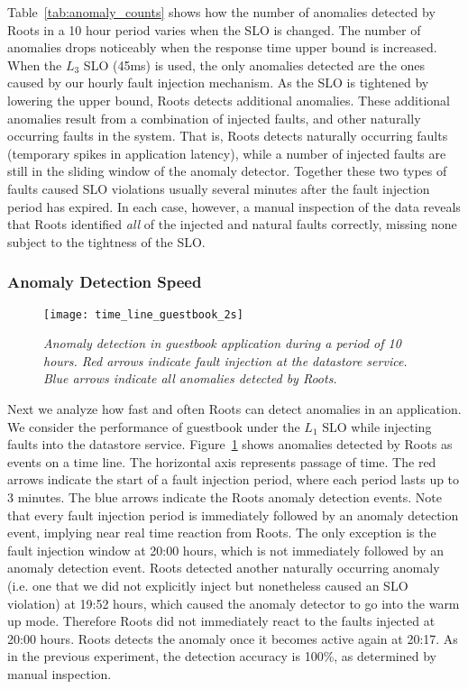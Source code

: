 Table~\ref{tab:anomaly_counts} shows how the number of anomalies detected by 
Roots in a 10 hour period varies when the SLO is changed. The number of anomalies
drops noticeably when the response time upper bound is increased. When the $L_3$
SLO (45ms) is used, the only anomalies detected are the ones
caused by our hourly fault injection mechanism. As the SLO is tightened by lowering the upper bound,
Roots detects additional anomalies. These additional anomalies
result from a combination of injected faults, and other naturally occurring faults
in the system. That is, Roots detects naturally occurring
faults (temporary spikes in application latency), while a number of injected faults
are still in the sliding window of the anomaly detector. Together these two types of
faults caused SLO violations usually several minutes after the fault injection period
has expired.  In each case, however, a manual inspection of the data reveals
that Roots identified \textit{all} of the injected and natural faults correctly,
missing none subject to the tightness of the SLO.

\subsubsection{Anomaly Detection Speed}

\begin{figure}
\centering
\texttt{[image: time\_line\_guestbook\_2s]}
\caption{\textit{Anomaly detection in guestbook application during a period of 10 hours. 
Red arrows indicate fault injection
at the datastore service. Blue arrows indicate all anomalies detected by
Roots.
}}
\label{fig:time_line_guestbook_2s}
\end{figure}

Next we analyze how fast and often Roots can detect anomalies in an application. We
consider the performance of guestbook under the $L_1$ SLO while 
injecting faults into the datastore service. Figure~\ref{fig:time_line_guestbook_2s} shows
anomalies detected by Roots as events on a time line. The horizontal axis represents 
passage of time. The red arrows indicate the start of a fault injection period, where each
period lasts up to 3 minutes.
The blue arrows indicate the Roots anomaly detection events.
Note that every fault injection period is immediately followed by an anomaly
detection event, implying near real time reaction from Roots. The only exception is the fault
injection window at 20:00 hours, which is not immediately followed by an anomaly 
detection event. Roots detected another naturally occurring anomaly
(i.e. one
that we did not explicitly inject but nonetheless caused an SLO violation) at 19:52 hours,
which caused the anomaly detector to go into the warm up mode. Therefore Roots
did not immediately react to the faults injected at 20:00 hours. Roots detects the anomaly once it becomes
active again at 20:17. As in the previous
experiment, the detection accuracy is 100\%, as determined by manual
inspection.

